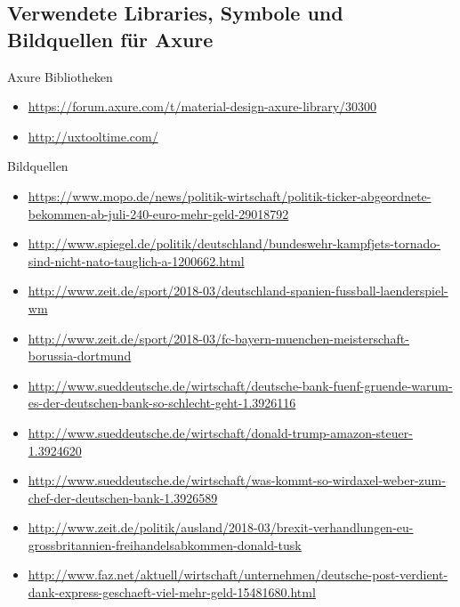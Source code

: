 \subsection{Verwendete Libraries, Symbole und Bildquellen für Axure}

Axure Bibliotheken

\begin{itemize}
  \sloppy

  \item \url{https://forum.axure.com/t/material-design-axure-library/30300}
  \item \url{http://uxtooltime.com/}

\end{itemize}

Bildquellen

\begin{itemize}

  \item \url{https://www.mopo.de/news/politik-wirtschaft/politik-ticker-abgeordnete-bekommen-ab-juli-240-euro-mehr-geld-29018792}
  \item \url{http://www.spiegel.de/politik/deutschland/bundeswehr-kampfjets-tornado-sind-nicht-nato-tauglich-a-1200662.html}
  \item \url{http://www.zeit.de/sport/2018-03/deutschland-spanien-fussball-laenderspiel-wm}
  \item \url{http://www.zeit.de/sport/2018-03/fc-bayern-muenchen-meisterschaft-borussia-dortmund}
  \item \url{http://www.sueddeutsche.de/wirtschaft/deutsche-bank-fuenf-gruende-warum-es-der-deutschen-bank-so-schlecht-geht-1.3926116}
  \item \url{http://www.sueddeutsche.de/wirtschaft/donald-trump-amazon-steuer-1.3924620}
  \item \url{http://www.sueddeutsche.de/wirtschaft/was-kommt-so-wirdaxel-weber-zum-chef-der-deutschen-bank-1.3926589}
  \item \url{http://www.zeit.de/politik/ausland/2018-03/brexit-verhandlungen-eu-grossbritannien-freihandelsabkommen-donald-tusk}
  \item \url{http://www.faz.net/aktuell/wirtschaft/unternehmen/deutsche-post-verdient-dank-express-geschaeft-viel-mehr-geld-15481680.html}
\end{itemize}

